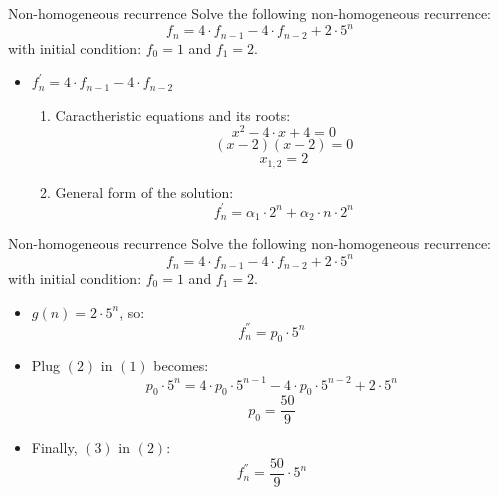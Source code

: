\documentclass{beamer}
\begin{document}
\begin{frame}{Non-homogeneous recurrence}
    Solve the following non-homogeneous recurrence:
    \begin{equation}\tag{1}
        f_n = 4 \cdot f_{n-1} - 4 \cdot f_{n-2} + 2 \cdot 5^n
    \end{equation}
    with initial condition: $f_0 = 1$ and $f_1 = 2$.
    
    \begin{itemize}
        \item $ f_n^{'} =  4 \cdot f_{n-1} - 4 \cdot f_{n-2}$
        \begin{enumerate}
            \item Caractheristic equations and its roots:
                $$ x^2 - 4 \cdot x + 4 = 0 $$
                $$ (x - 2)(x - 2) = 0 $$
                $$ x_{1,2} = 2 $$
            \item General form of the solution:
                $$ f_n^{'} = \alpha_1 \cdot 2^n + \alpha_2 \cdot n \cdot 2^n $$
        \end{enumerate}
    \end{itemize}
\end{frame}

\begin{frame}{Non-homogeneous recurrence}
    Solve the following non-homogeneous recurrence:
    \begin{equation}\tag{1}
        f_n = 4 \cdot f_{n-1} - 4 \cdot f_{n-2} + 2 \cdot 5^n
    \end{equation}
    with initial condition: $f_0 = 1$ and $f_1 = 2$.
    
    \begin{itemize}
        \item $ g(n) =  2 \cdot 5^n$, so:
            \begin{equation}\tag{2}
                f_n^{''} = p_0 \cdot 5^n
            \end{equation}
        \item Plug $(2)$ in $(1)$ becomes:
            $$ p_0 \cdot 5^n = 4 \cdot p_0 \cdot 5^{n-1} - 4 \cdot p_0 \cdot 5^{n-2} + 2 \cdot 5^n $$
            \begin{equation}\tag{3}
                p_0 = \frac{50}{9}
            \end{equation}
        \item Finally, $(3)$ in $(2)$:
            $$ f_n^{''} = \frac{50}{9} \cdot 5^n $$
    \end{itemize}
\end{frame}
\end{document}
